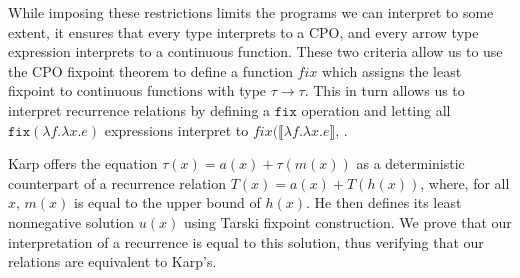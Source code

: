  While imposing these restrictions limits the programs we can interpret to some extent, it ensures 
that every type interprets to a CPO, and every arrow type expression interprets to a continuous function. These two 
criteria allow us to use the CPO fixpoint theorem to define a function $fix$ which assigns the least fixpoint to continuous functions with type $\tau \rightarrow \tau$. This in turn allows us to interpret recurrence relations by defining a $\texttt{fix}$ operation and letting all $\texttt{fix}(\lambda f.\lambda x.e)$ expressions interpret to $fix(\llbracket\lambda f.\lambda x.e\rrbracket$, .

Karp offers the equation $\tau(x) = a(x) + \tau(m(x))$ as a deterministic counterpart of a recurrence relation $T(x) = a(x) + 
T(h(x))$, where, for all $x$, $m(x)$ is equal to the upper bound of $h(x)$. He then defines its least nonnegative solution 
$u(x)$ using Tarski fixpoint construction. We prove that our interpretation of a recurrence is equal to this solution, thus 
verifying that our relations are equivalent to Karp's. 
